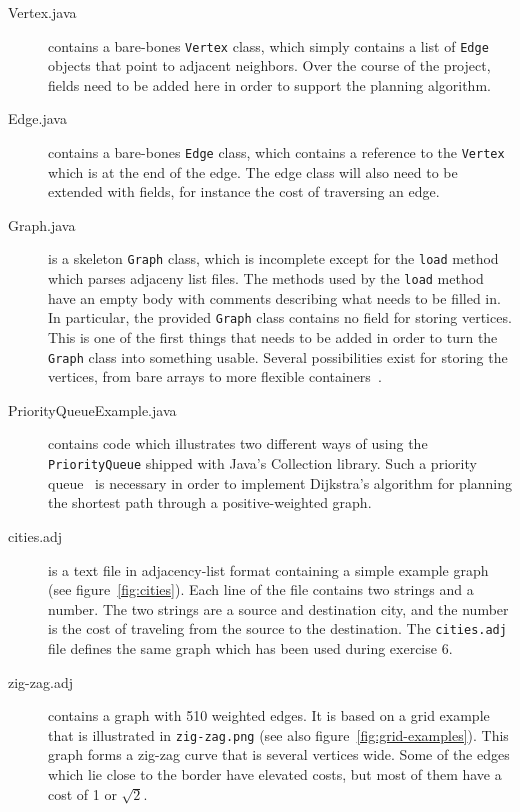 \documentclass[a4paper,10pt]{article}
\begin{document}
\begin{description}

\item[Vertex.java]
  contains a bare-bones \texttt{Vertex} class, which simply contains a list of \texttt{Edge} objects that point to adjacent neighbors.
  Over the course of the project, fields need to be added here in order to support the planning algorithm.

\item[Edge.java]
  contains a bare-bones \texttt{Edge} class, which contains a reference to the \texttt{Vertex} which is at the end of the edge.
  The edge class will also need to be extended with fields, for instance the cost of traversing an edge.

\item[Graph.java]
  is a skeleton \texttt{Graph} class, which is incomplete except for the \texttt{load} method which parses adjaceny list files.
  The methods used by the \texttt{load} method have an empty body with comments describing what needs to be filled in.
  In particular, the provided \texttt{Graph} class contains no field for storing vertices.
 This is one of the first things that needs to be added in order to turn the \texttt{Graph} class into something usable.
  Several possibilities exist for storing the vertices, from bare arrays to more flexible containers~\cite{java:linked-list,java:array-list,java:hash-set,java:tree-set,java:hash-map,java:tree-map}.
  
\item[PriorityQueueExample.java]
  contains code which illustrates two different ways of using the \texttt{PriorityQueue} shipped with Java's Collection library.
  Such a priority queue~\cite{wikipedia:priority-queue} is necessary in order to implement Dijkstra's algorithm for planning the shortest path through a positive-weighted graph.
  
\item[cities.adj]
  is a text file in adjacency-list format containing a simple example graph (see figure~\ref{fig:cities}).
  Each line of the file contains two strings and a number.
  The two strings are a source and destination city, and the number is the cost of traveling from the source to the destination.
  The \texttt{cities.adj} file defines the same graph which has been used during exercise 6.
  
\item[zig-zag.adj]
  contains a graph with 510 weighted edges.
  It is based on a grid example that is illustrated in \texttt{zig-zag.png} (see also figure~\ref{fig:grid-examples}).
  This graph forms a zig-zag curve that is several vertices wide.
  Some of the edges which lie close to the border have elevated costs, but most of them have a cost of 1 or $\sqrt{2}$.
  

\end{description}
\end{document}
